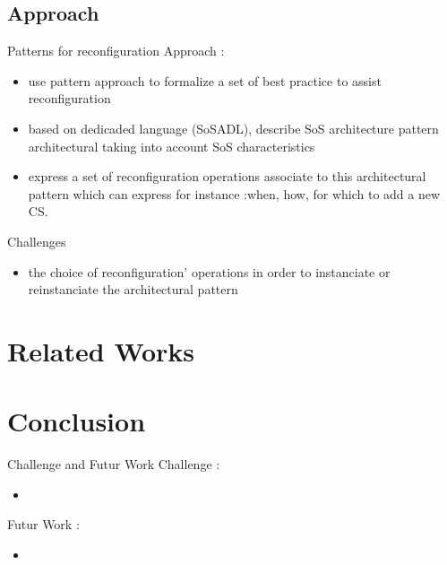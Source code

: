 \documentclass{beamer}
\begin{document}
\subsection{Approach}
\begin{frame}{Patterns for reconfiguration}
  Approach :
  \begin{itemize}
  \item use pattern approach to formalize a set of best practice to assist
    reconfiguration
  \end{itemize}

  \begin{itemize}
  \item based on dedicaded language (SoSADL), describe SoS architecture
    pattern architectural taking into account SoS characteristics
  \item express a set of reconfiguration operations associate to this
    architectural pattern which can express for instance :when, how,
    for which to add a new CS.
  \end{itemize}
\end{frame}


\begin{frame}{Challenges}
  \begin{itemize}
  \item the choice of reconfiguration' operations in order to instanciate or reinstanciate the architectural pattern
  \end{itemize}
\end{frame}


\section{Related Works}

\begin{frame}{}
\end{frame}

\section{Conclusion}

\begin{frame}{Challenge and Futur Work}
  Challenge : 
  \begin{itemize}
  \item
  \end{itemize}

  Futur Work :
  \begin{itemize}
  \item
  \end{itemize}
\end{frame}
\end{document}
